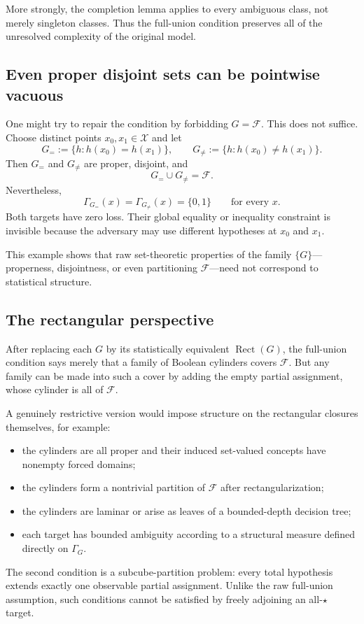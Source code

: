 \documentclass[11pt]{article}
\theoremstyle{definition}
\theoremstyle{remark}
\newcommand{\X}{\mathcal X}
\newcommand{\F}{\mathcal F}
\newcommand{\Rect}{\operatorname{Rect}}
\newcommand{\1}{\mathbf 1}
\begin{document}
More strongly, the completion lemma applies to every ambiguous class, not merely singleton classes. Thus the full-union condition preserves all of the unresolved complexity of the original model.

\subsection{Even proper disjoint sets can be pointwise vacuous}

One might try to repair the condition by forbidding $G=\F$. This does not suffice. Choose distinct points $x_0,x_1\in\X$ and let
\[
    G_{=}:=\{h:h(x_0)=h(x_1)\},
    \qquad
    G_{\neq}:=\{h:h(x_0)\neq h(x_1)\}.
\]
Then $G_{=}$ and $G_{\neq}$ are proper, disjoint, and
\[
    G_{=}\cup G_{\neq}=\F.
\]
Nevertheless,
\[
    \Gamma_{G_=}(x)=\Gamma_{G_{\neq}}(x)=\{0,1\}
    \qquad\text{for every }x.
\]
Both targets have zero loss. Their global equality or inequality constraint is invisible because the adversary may use different hypotheses at $x_0$ and $x_1$.

This example shows that raw set-theoretic properties of the family $\{G\}$---properness, disjointness, or even partitioning $\F$---need not correspond to statistical structure.

\subsection{The rectangular perspective}

After replacing each $G$ by its statistically equivalent $\Rect(G)$, the full-union condition says merely that a family of Boolean cylinders covers $\F$. But any family can be made into such a cover by adding the empty partial assignment, whose cylinder is all of $\F$.

A genuinely restrictive version would impose structure on the rectangular closures themselves, for example:
\begin{itemize}
    \item the cylinders are all proper and their induced set-valued concepts have nonempty forced domains;
    \item the cylinders form a nontrivial partition of $\F$ after rectangularization;
    \item the cylinders are laminar or arise as leaves of a bounded-depth decision tree;
    \item each target has bounded ambiguity according to a structural measure defined directly on $\Gamma_G$.
\end{itemize}
The second condition is a subcube-partition problem: every total hypothesis extends exactly one observable partial assignment. Unlike the raw full-union assumption, such conditions cannot be satisfied by freely adjoining an all-$\star$ target.
\end{document}
